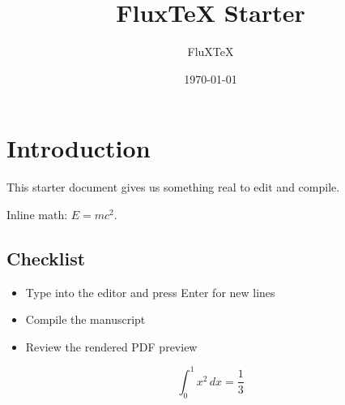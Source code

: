\documentclass{article}
\title{FluxTeX Starter}
\author{FluXTeX}
\date{\today}
\begin{document}
\maketitle

\section{Introduction}
This starter document gives us something real to edit and compile.

Inline math: $E = mc^2$.

\subsection{Checklist}
\begin{itemize}
  \item Type into the editor and press Enter for new lines
  \item Compile the manuscript
  \item Review the rendered PDF preview
\end{itemize}
\newpage
\newpage


\[
  \int_0^1 x^2\,dx = \frac{1}{3}
\]
\end{document}
